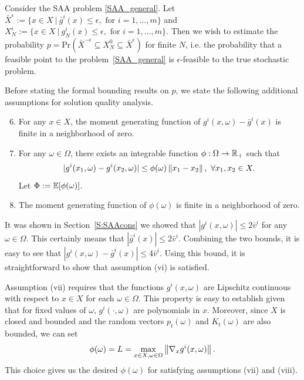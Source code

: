 Consider the SAA problem \eqref{SAA_general}. Let $\bar{X}^{\epsilon} := \{x \in
X \ | \ \bar{g}^i(x) \leq \epsilon, \text{ for } i = 1, \ldots, m \}$ and
$X_N^{\epsilon} := \{x \in X \ | \ g^i_N(x) \leq \epsilon, \text{ for } i = 1,
\ldots, m \}$. Then we wish to estimate the probability
$p = \text{Pr}(\bar{X}^{-\epsilon} \subseteq X_N^0 \subseteq \bar{X}^{\epsilon})$
for finite $N$, i.e. the probability that a feasible point to the
problem~\eqref{SAA_general} is $\epsilon$-feasible to the true stochastic
problem. 

Before stating the formal bounding results on $p$, we state the following
additional assumptions for solution quality analysis. 
\begin{enumerate}[label=(\roman*)]
	\setcounter{enumi}{5}
	\item{For any $x \in X$, the moment generating function of $g^i(x,\omega) -
		\bar{g}^i(x)$ is finite in a neighborhood of zero.}
	\item{For any $\omega \in \Omega$, there exists an integrable function $\phi:
		\Omega \to \mathbb R_+$ such that 
		\[ | g^i(x_1, \omega) - g^i(x_2, \omega) | \leq \phi(\omega) \left\Vert x_1 - x_2\right\Vert, \
		\forall x_1, x_2 \in X. \] Let $\Phi := \mathbb{E}[\phi(\omega)]$.}
	\item{The moment generating function of $\phi(\omega)$ is finite in a
		neighborhood of zero.}
\end{enumerate}
It was shown in Section~\ref{S:SAAcons} we showed that $| g^i(x,\omega) | \leq 2 \bar{v}^i$ for any $\omega \in \Omega$. This certainly means that $| \bar{g}^i(x) | \leq 2 \bar{v}^i$. Combining the
two bounds, it is easy to see that $| g^i(x,\omega) - \bar{g}^i(x) | \leq 4
\bar{v}^i$. Using this bound, it is straightforward to show that assumption (vi)
is satisfied.

Assumption (vii) requires that the functions $g^i(x,\omega)$ are Lipschitz
continuous with respect to $x \in X$ for each $\omega \in \Omega$. This property is
easy to establish given that for fixed values of $\omega$, $g^i(\cdot, \omega)$
are polynomials in $x$. Moreover, since $X$ is closed and bounded and the random
vectors $p_t(\omega)$ and $K_t(\omega)$ are also bounded, we can set
\[ \phi(\omega) = L = \max_{x \in X, \omega \in \Omega} \left\Vert\nabla_x g^i(x,
	\omega)\right\Vert. \]
This choice gives us the desired $\phi(\omega)$ for satisfying assumptions (vii)
and (viii).

